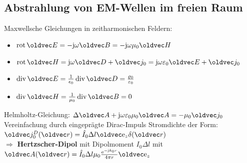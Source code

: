\documentclass[6pt,a4paper]{scrartcl}
\let\vec\oldvec
\begin{document}
\begin{multicols}{4}
	\subsection{Abstrahlung von EM-Wellen im freien Raum}
	Maxwellsche Gleichungen in zeitharmonischen Feldern:
	\begin{itemize}
		\item $\rot\vec E = -\j\omega\vec B = -\j\omega\mu_0\vec H$
		\item $\rot\vec H = \j\omega\vec D + \vec j_0 = \j\omega\varepsilon_0\vec E+\vec j_0$
		\item $\div\vec E = \frac{1}{\epsilon_0}\div\vec D = \frac{\varrho_0}{\varepsilon_0}$
		\item $\div\vec H = \frac{1}{\mu_0}\div\vec B = 0$
	\end{itemize}
	Helmholtz-Gleichung: $\Delta\vec A + \j\omega\varepsilon_0\mu_0\vec A = -\mu_0\vec j_0$\\
	Vereinfachung durch eingeprägte Dirac-Impuls Stromdichte der Form: $\vec j_0^D(\vec  r) = \hat I_0\Delta l\vec\e_z\delta(\vec r)$\\
	$\Rightarrow$ \textbf{Hertzscher-Dipol} mit Dipolmoment $I_0\Delta l$ mit $\vec A(\vec r) = \hat I_0\Delta l\mu_0\frac{\e^{-\j k_0r}}{4\pi r}\vec\e_z$\\

\end{multicols}
\end{document}
